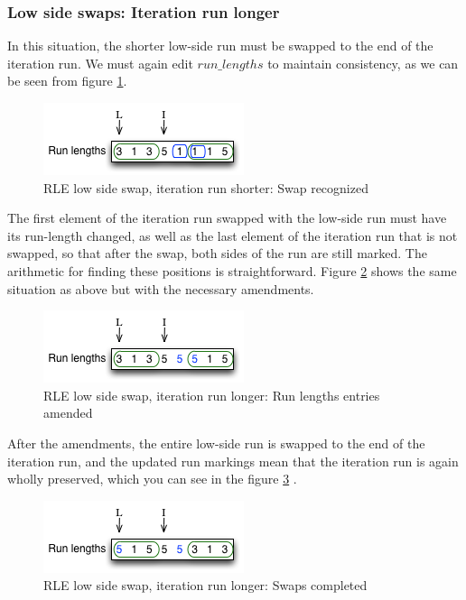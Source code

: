 \subsubsection{Low side swaps: Iteration run longer}

In this situation, the shorter low-side run must be swapped to the end of the iteration run. We must again edit $run\_lengths$ to maintain consistency, as we can be seen from figure \ref{fig:rle_lowside_2a}.

\begin{figure}[H]
  \centering
  \includegraphics[]{images/d15_rle_lowside_2a}
  \caption{RLE low side swap, iteration run shorter: Swap recognized}
  \label{fig:rle_lowside_2a}
\end{figure}

The first element of the iteration run swapped with the low-side run must have its run-length changed, as well as the last element of the iteration run that is not swapped, so that after the swap, both sides of the run are still marked. The arithmetic for finding these positions is straightforward. Figure \ref{fig:rle_lowside_2b} shows the same situation as above but with the necessary amendments.

\begin{figure}[H]
  \centering
  \includegraphics[]{images/d15_rle_lowside_2b}
  \caption{RLE low side swap, iteration run longer: Run lengths entries amended}
  \label{fig:rle_lowside_2b}
\end{figure}

After the amendments, the entire low-side run is swapped to the end of the iteration run, and the updated run markings mean that the iteration run is again wholly preserved, which you can see in the figure \ref{fig:rle_lowside_2c} .

\begin{figure}[H]
  \centering
  \includegraphics[]{images/d15_rle_lowside_2c}
  \caption{RLE low side swap, iteration run longer: Swaps completed}
  \label{fig:rle_lowside_2c}
\end{figure}

